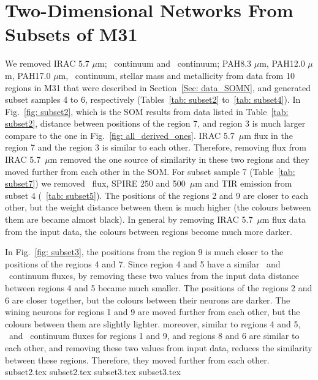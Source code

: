 \chapter{Two-Dimensional Networks From Subsets of M31}
\pagestyle{plain}
\label{sec: app_2d_soms_SOMN}
\newpage
\myappendices

        We removed IRAC 5.7 $\mu$m; \sii~continuum and \oiii~continuum; PAH8.3 $\mu$m, PAH12.0 $\mu$m, PAH17.0 $\mu$m, \oiii~continuum, stellar mass and metallicity from data from 10 regions in M31 that were described in Section~\ref{Sec: data_SOMN}, and generated subset samples 4 to 6, respectively (Tables~\ref{tab: subset2} to~\ref{tab: subset4}).
        In Fig.~\ref{fig: subset2}, which is the SOM results from data listed in Table~\ref{tab: subset2}, distance between positions of the region 7, and region 3 is much larger compare to the one in Fig.~\ref{fig: all_derived_ones}. 
        IRAC 5.7~$\mu$m flux in the region 7 and the region 3 is similar to each other. 
        Therefore, removing flux from IRAC 5.7~$\mu$m removed the one source of similarity in these two regions and they moved further from each other in the SOM.
        For subset sample 7 (Table~\ref{tab: subset7}) we removed \sii~flux, SPIRE 250 and 500~$\mu$m and TIR emission from subset 4 (~\ref{tab: subset5}).
        The positions of the regions 2 and 9 are closer to each other, but the weight distance between them is much higher (the colours between them are became almost black). 
        In general by removing IRAC 5.7~$\mu$m flux data from the input data, the colours between regions become much more darker.
      
        In Fig.~\ref{fig: subset3}, the positions from the region 9 is much closer to the positions of the regions 4 and 7. 
        Since region 4 and 5 have a similar \oiii~and \sii~continuum fluxes, by removing these two values from the input data distance between regions 4 and 5 became much smaller.
        The positions of the regions 2 and 6 are closer together, but the colours between their neurons are darker.
        The wining neurons for regions 1 and 9 are moved further from each other, but the colours between them are slightly lighter. 
        moreover, similar to regions 4 and 5, \oiii~and \sii~continuum fluxes for regions 1 and 9, and regions 8 and 6 are similar to each other, and removing these two values from input data, reduces the similarity between these regions. Therefore, they moved further from each other. 
         {subset2.tex}
        {subset2.tex}
        {subset3.tex}
        {subset3.tex}
        
